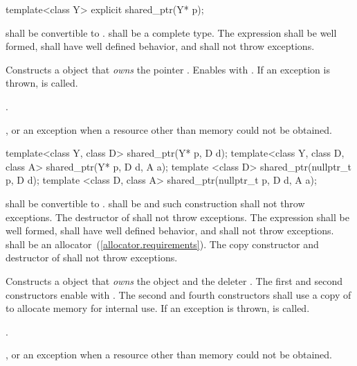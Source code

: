 %
\begin{itemdecl}
template<class Y> explicit shared_ptr(Y* p);
\end{itemdecl}

\begin{itemdescr}
\pnum\requires  {} shall be convertible to .
 shall be a complete type. The expression 
shall be well formed, shall have well defined behavior, and shall not
throw exceptions.

\pnum\effects Constructs a  object
that \textit{owns} the pointer .
Enables  with .
If an exception is thrown,  is called.

\pnum\postconditions  {}.

\pnum\throws {}, or an  exception when a resource other than memory could not be obtained.
\end{itemdescr}

%
\begin{itemdecl}
template<class Y, class D> shared_ptr(Y* p, D d);
template<class Y, class D, class A> shared_ptr(Y* p, D d, A a);
template <class D> shared_ptr(nullptr_t p, D d);
template <class D, class A> shared_ptr(nullptr_t p, D d, A a);
\end{itemdecl}

\begin{itemdescr}
\pnum\requires  {} shall be convertible to .  shall be
 and such construction shall not throw exceptions.
The destructor of 
shall not throw exceptions. The expression  shall be
well formed, shall have well defined behavior, and shall not throw exceptions.
 shall be an allocator~(\ref{allocator.requirements}).
The copy constructor and destructor of  shall not throw exceptions.

\pnum\effects  Constructs a  object that \textit{owns} the
object  and the deleter .
The first and second constructors enable  with .
The second and fourth constructors shall use a copy of  to
allocate memory for internal use.
If an exception is thrown,  is called.

\pnum\postconditions  {}.

\pnum\throws  {}, or an  exception
when a resource other than memory could not be obtained.
\end{itemdescr}

